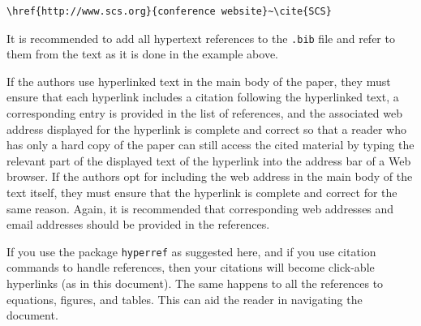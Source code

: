 \documentclass{scspaperproc}
\theoremstyle{scsthe}
\begin{document}
\begin{verbatim}
\href{http://www.scs.org}{conference website}~\cite{SCS}
\end{verbatim}

It is recommended to add all hypertext references to the \texttt{.bib} file and refer to them from the text as it is done in the example above.

If the authors use hyperlinked text in the main body of the paper, they must ensure that each hyperlink includes a citation following the hyperlinked text, a corresponding entry is provided in the list of references, and the associated web address displayed for the hyperlink is complete and correct so that a reader who has only a hard copy of the paper can still access the cited material by typing the relevant part of the displayed text of the hyperlink into the address bar of a Web browser. If the authors opt for including the web address in the main body of the text itself, they must ensure that the hyperlink is complete and correct for the same reason. Again, it is recommended that corresponding web addresses and email addresses should be provided in the references.

If you use the package \texttt{hyperref} as suggested here, and if you use citation commands to handle references, then your citations will
become click-able hyperlinks (as in this document). The same happens to all the references to equations, figures, and tables. This can aid the reader in navigating the document.
\end{document}
